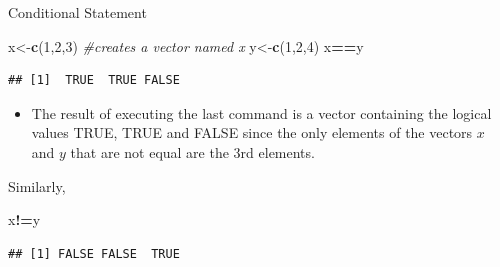 \documentclass[
  ignorenonframetext,
]{beamer}
\newenvironment{Shaded}{\begin{snugshade}}{\end{snugshade}}
\newcommand{\CommentTok}[1]{\textcolor[rgb]{0.56,0.35,0.01}{\textit{#1}}}
\newcommand{\DecValTok}[1]{\textcolor[rgb]{0.00,0.00,0.81}{#1}}
\newcommand{\FunctionTok}[1]{\textcolor[rgb]{0.13,0.29,0.53}{\textbf{#1}}}
\newcommand{\NormalTok}[1]{#1}
\newcommand{\OtherTok}[1]{\textcolor[rgb]{0.56,0.35,0.01}{#1}}
\newcommand{\SpecialCharTok}[1]{\textcolor[rgb]{0.81,0.36,0.00}{\textbf{#1}}}
\providecommand{\tightlist}{%
  \setlength{\itemsep}{0pt}\setlength{\parskip}{0pt}}
\begin{document}
\begin{frame}[fragile]{Conditional Statement}
\protect\hypertarget{conditional-statement}{}
\small

\begin{Shaded}
\begin{Highlighting}[]
\NormalTok{x}\OtherTok{\textless{}{-}}\FunctionTok{c}\NormalTok{(}\DecValTok{1}\NormalTok{,}\DecValTok{2}\NormalTok{,}\DecValTok{3}\NormalTok{)  }\CommentTok{\#creates a vector named x}
\NormalTok{y}\OtherTok{\textless{}{-}}\FunctionTok{c}\NormalTok{(}\DecValTok{1}\NormalTok{,}\DecValTok{2}\NormalTok{,}\DecValTok{4}\NormalTok{)}
\NormalTok{x}\SpecialCharTok{==}\NormalTok{y}
\end{Highlighting}
\end{Shaded}

\begin{verbatim}
## [1]  TRUE  TRUE FALSE
\end{verbatim}

\normalsize

\begin{itemize}
\tightlist
\item
  The result of executing the last command is a vector containing the
  logical values TRUE, TRUE and FALSE since the only elements of the
  vectors \(x\) and \(y\) that are not equal are the 3rd elements.
\end{itemize}

Similarly, \small

\begin{Shaded}
\begin{Highlighting}[]
\NormalTok{x}\SpecialCharTok{!=}\NormalTok{y}
\end{Highlighting}
\end{Shaded}

\begin{verbatim}
## [1] FALSE FALSE  TRUE
\end{verbatim}

\normalsize
\end{frame}
\end{document}
